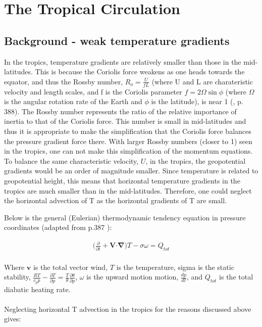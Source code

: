 \documentclass[letterpaper,12pt,titlepage,oneside,final]{book}
\begin{document}
\section{The Tropical Circulation}
\subsection{Background - weak temperature gradients}
In the tropics, temperature gradients are relatively smaller than those in the mid-latitudes. This is because the Coriolis force weakens as one heads towards the equator, and thus the Rossby number, $R_{o}=\frac{U}{fL}$ (where U and L are charateristic velocity and length scales, and f is the Coriolis parameter $f=2\Omega\sin{\phi}$ (where $\Omega$ is the angular rotation rate of the Earth and $\phi$ is the latitude), is near 1 (\cite{holton_introduction_2004}, p. 388). The Rossby number represents the ratio of the relative importance of inertia to that of the Coriolis force. This number is small in mid-latitudes and thus it is appropriate to make the simplification that the Coriolis force balances the pressure gradient force there. With larger Rossby numbers (closer to 1) seen in the tropics, one can not make this simplification of the momentum equations. To balance the same characteristic velocity, $U$, in the tropics, the geopotential gradients would be an order of magnitude smaller. Since temperature is related to geopotential height, this means that horizontal temperature gradients in the tropics are much smaller than in the mid-latitudes. Therefore, one could neglect the horizontal advection of T as the horizontal gradients of T are small. 

Below is the general (Eulerian) thermodynamic tendency equation in pressure coordinates (adapted from p.387 \cite{holton_introduction_2004}):

\begin{align}
\Big(\frac{\partial}{\partial{t}}+\mathbf{V}\boldsymbol{\cdot} \mathbf{\nabla}\Big)T - \sigma\omega =Q_{tot}
\end{align}
\\
Where $\mathbf{v}$ is the total vector wind, $T$ is the temperature, sigma is the static stability, $\frac{RT}{c_{p}p} - \frac{\partial{T}}{\partial{p}} = \frac{T}{\theta}\frac{\partial{\theta}}{\partial{p}}$, $\omega$ is the upward motion motion, $\frac{dp}{dt}$, and $Q_{tot}$ is the total diabatic heating rate. 
\\
\\
Neglecting horizontal T advection in the tropics for the reasons discussed above gives:
\end{document}
